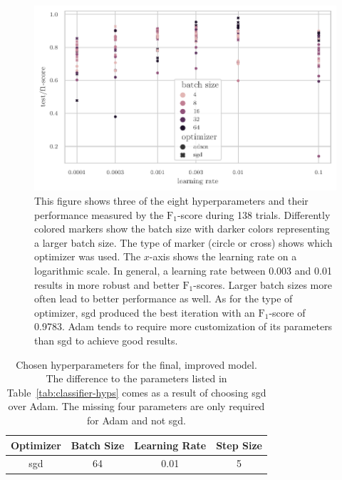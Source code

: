 \documentclass[draft,final]{vutinfth} %
\begin{document}
\begin{figure}
  \centering
  \includegraphics{graphics/classifier-hyp-metrics.pdf}
  \caption[Classifier hyperparameter optimization results.]{This
    figure shows three of the eight hyperparameters and their
    performance measured by the $\mathrm{F}_1$-score during \num{138}
    trials. Differently colored markers show the batch size with
    darker colors representing a larger batch size. The type of marker
    (circle or cross) shows which optimizer was used. The $x$-axis
    shows the learning rate on a logarithmic scale. In general, a
    learning rate between \num{0.003} and \num{0.01} results in more
    robust and better $\mathrm{F}_1$-scores. Larger batch sizes more
    often lead to better performance as well. As for the type of
    optimizer, \gls{sgd} produced the best iteration with an
    $\mathrm{F}_1$-score of \num{0.9783}. Adam tends to require more
    customization of its parameters than \gls{sgd} to achieve good
    results.}
  \label{fig:classifier-hyp-results}
\end{figure}

\begin{table}
  \centering
  \begin{tabular}{cccc}
    \toprule
    Optimizer &  Batch Size & Learning Rate & Step Size \\
    \midrule
    \gls{sgd} & 64 & 0.01 & 5\\
    \bottomrule
  \end{tabular}
  \caption[Hyperparameters for the optimized classifier.]{Chosen
    hyperparameters for the final, improved model. The difference to
    the parameters listed in Table~\ref{tab:classifier-hyps} comes as
    a result of choosing \gls{sgd} over Adam. The missing four
    parameters are only required for Adam and not \gls{sgd}.}
  \label{tab:classifier-final-hyps}
\end{table}
\end{document}
